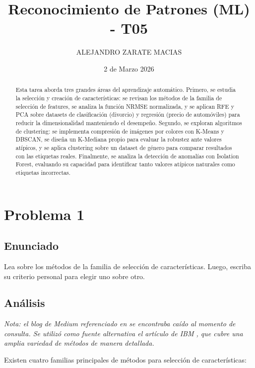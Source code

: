 \documentclass{article}
\title{Reconocimiento de Patrones (ML) - T05}
\author{ALEJANDRO ZARATE MACIAS}
\date{2 de Marzo 2026}
\begin{document}
\maketitle

\begin{abstract}
Esta tarea aborda tres grandes áreas del aprendizaje automático. Primero, se estudia la selección y creación de características: se revisan los métodos de la familia de selección de features, se analiza la función NRMSE normalizada, y se aplican RFE y PCA sobre datasets de clasificación (divorcio) y regresión (precio de automóviles) para reducir la dimensionalidad manteniendo el desempeño. Segundo, se exploran algoritmos de clustering: se implementa compresión de imágenes por colores con K-Means y DBSCAN, se diseña un K-Mediana propio para evaluar la robustez ante valores atípicos, y se aplica clustering sobre un dataset de género para comparar resultados con las etiquetas reales. Finalmente, se analiza la detección de anomalías con Isolation Forest, evaluando su capacidad para identificar tanto valores atípicos naturales como etiquetas incorrectas.
\end{abstract}


\section{Problema 1}

\subsection{Enunciado}

Lea \cite{featureSelectionMethods} sobre los métodos de la familia de selección de características. Luego, escriba su criterio personal para elegir uno sobre otro.

\subsection{Análisis}

\textit{Nota: el blog de Medium referenciado en \cite{featureSelectionMethods} se encontraba caído al momento de consulta. Se utilizó como fuente alternativa el artículo de IBM \cite{featureSelectionIBM}, que cubre una amplia variedad de métodos de manera detallada.}


Existen cuatro familias principales de métodos para selección de características:
\end{document}
